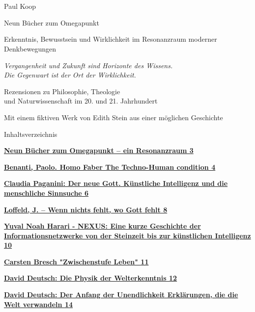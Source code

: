 \documentclass[
]{article}
\author{}
\date{}
\begin{document}
{
\setcounter{tocdepth}{3}
\tableofcontents
}
\section{}\label{section}

Paul Koop

Neun Bücher zum Omegapunkt

Erkenntnis, Bewusstsein und Wirklichkeit im Resonanzraum moderner Denkbewegungen

\emph{Vergangenheit und Zukunft sind Horizonte des Wissens.\\
Die Gegenwart ist der Ort der Wirklichkeit.}

Rezensionen zu Philosophie, Theologie\\
und Naturwissenschaft im 20. und 21. Jahrhundert

Mit einem fiktiven Werk von Edith Stein\textbf{\hfill\break
}aus einer möglichen Geschichte

Inhaltsverzeichnis

\hyperref[neun-buxfccher-zum-omegapunkt-ein-resonanzraum]{\textbf{Neun Bücher zum Omegapunkt -- ein Resonanzraum 3}}

\hyperref[benanti-paolo.-homo-faber-the-techno-human-condition]{\textbf{Benanti, Paolo. Homo Faber The Techno-Human condition 4}}

\hyperref[claudia-paganini-der-neue-gott.-kuxfcnstliche-intelligenz-und-die-menschliche-sinnsuche]{\textbf{Claudia Paganini: Der neue Gott. Künstliche Intelligenz und die menschliche Sinnsuche 6}}

\hyperref[loffeld-j.-wenn-nichts-fehlt-wo-gott-fehlt]{\textbf{Loffeld, J. -- Wenn nichts fehlt, wo Gott fehlt 8}}

\hyperref[yuval-noah-harari---nexus-eine-kurze-geschichte-der-informationsnetzwerke-von-der-steinzeit-bis-zur-kuxfcnstlichen-intelligenz]{\textbf{Yuval Noah Harari - NEXUS: Eine kurze Geschichte der Informationsnetzwerke von der Steinzeit bis zur künstlichen Intelligenz 10}}

\hyperref[carsten-bresch-zwischenstufe-leben]{\textbf{Carsten Bresch "Zwischenstufe Leben" 11}}

\hyperref[david-deutsch-die-physik-der-welterkenntnis]{\textbf{David Deutsch: Die Physik der Welterkenntnis 12}}

\hyperref[david-deutsch-der-anfang-der-unendlichkeit-erkluxe4rungen-die-die-welt-verwandeln]{\textbf{David Deutsch: Der Anfang der Unendlichkeit Erklärungen, die die Welt verwandeln 14}}
\end{document}
